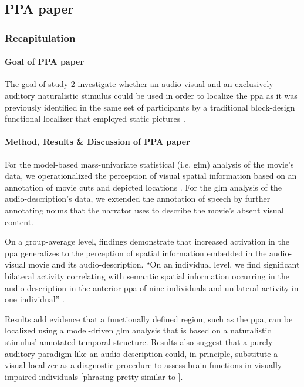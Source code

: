 \subsection{PPA paper}

\subsubsection{Recapitulation}

\paragraph{Goal of PPA paper}
The goal of study 2 investigate whether an audio-visual and an exclusively
auditory naturalistic stimulus could be used in order to localize the \ac{ppa}
as it was previously identified in the same set of participants by a traditional
block-design functional localizer that employed static pictures
\citep{sengupta2016extension}.


\paragraph{Method, Results \& Discussion of PPA paper}
For the model-based mass-univariate statistical (i.e. \ac{glm}) analysis of the
movie's data, we operationalized the perception of visual spatial information
based on an annotation of movie cuts and depicted locations
\citep{haeusler2016cutanno}.
For the \ac{glm} analysis of the audio-description's data, we extended the
annotation of speech \citep{haeusler2021speechanno} by further annotating nouns
that the narrator uses to describe the movie's absent visual content.

On a group-average level, findings demonstrate that increased activation in the
\ac{ppa} generalizes to the perception of spatial information embedded in the
audio-visual movie and its audio-description.
``On an individual level, we find significant bilateral activity correlating
with semantic spatial information occurring in the audio-description in the
anterior \ac{ppa} of nine individuals and unilateral activity in one
individual'' \citep{haeusler2022processing}.

Results add evidence \citep[cf.][]{bartels2004mapping} that a functionally
defined region, such as the \ac{ppa}, can be localized using a model-driven
\ac{glm} analysis that is based on a naturalistic stimulus' annotated temporal
structure.
Results also suggest that a purely auditory paradigm like an audio-description
could, in principle, substitute a visual localizer as a diagnostic procedure to
assess brain functions in visually impaired individuals
[phrasing pretty similar to \citep{haeusler2022processing}].


